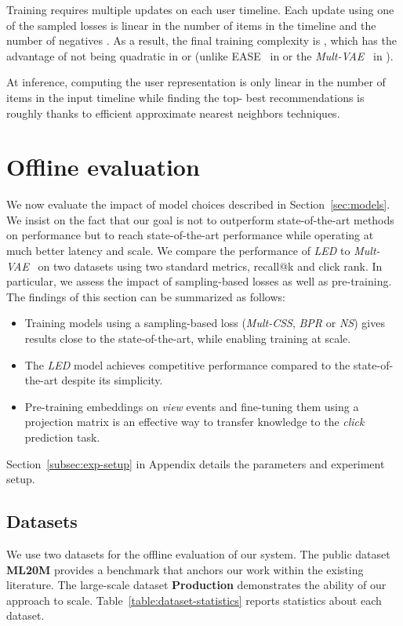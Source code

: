 \documentclass[sigconf]{acmart}
\begin{document}
Training requires multiple updates on each user timeline. Each update using one of the sampled losses is linear in the number of items in the timeline and the number of negatives . As a result, the final training complexity is , which has the advantage of not being quadratic in  or  (unlike EASE~\cite{ease-vae} in  or the \emph{Mult-VAE}~\cite{variational-liang-2018} in ). 



At inference, computing the user representation  is only linear in the number of items in the input timeline while finding the top- best recommendations is roughly  thanks to efficient approximate nearest neighbors techniques.

\section{Offline evaluation}
\label{sec:offline-evaluation}
We now evaluate the impact of model choices described in Section~\ref{sec:models}. We insist on the fact that our goal is not to outperform state-of-the-art methods on performance but to reach state-of-the-art performance while operating at much better latency and scale. We compare the performance of \emph{LED} to \emph{Mult-VAE}~\cite{variational-liang-2018} on two datasets using two standard metrics, recall@k and click rank. In particular, we assess the impact of sampling-based losses as well as pre-training. The findings of this section can be summarized as follows:

\begin{itemize}
    \item Training models using a sampling-based loss (\emph{Mult-CSS}\cite{pmlr-v54-botev17a}, \emph{BPR}\cite{bpr} or \emph{NS}\cite{NIPS2013_5021}) gives results close to the state-of-the-art, while enabling training at scale.
    \item The \emph{LED} model achieves competitive performance compared to the state-of-the-art despite its simplicity.
    \item Pre-training embeddings on \emph{view} events and fine-tuning them using a projection matrix is an effective way to transfer knowledge to the \emph{click} prediction task.
\end{itemize}

Section~\ref{subsec:exp-setup} in Appendix details the parameters and experiment setup.

\subsection{Datasets}
\label{sec:datasets}
We use two datasets for the offline evaluation of our system.  The public dataset \textbf{ML20M} provides a benchmark that anchors our work within the existing literature.  The large-scale dataset \textbf{Production} demonstrates the ability of our approach to scale. Table~\ref{table:dataset-statistics} reports statistics about each dataset.
\end{document}
